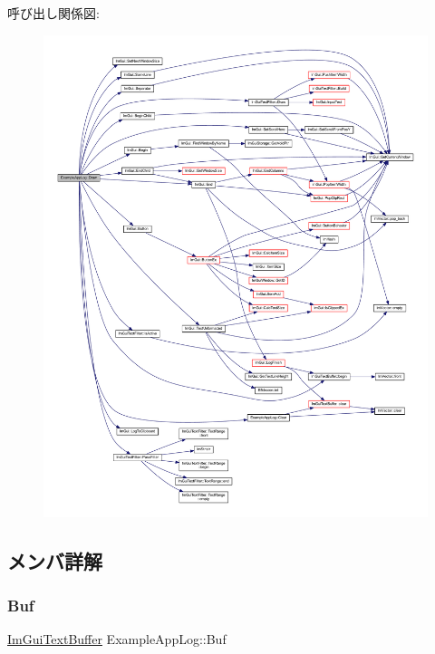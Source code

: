 呼び出し関係図\+:\nopagebreak
\begin{figure}[H]
\begin{center}
\leavevmode
\includegraphics[width=350pt]{struct_example_app_log_a5ad3a4bdb89171b84aeaff96948a1f77_cgraph}
\end{center}
\end{figure}


\subsection{メンバ詳解}
\mbox{\label{struct_example_app_log_a74fb7cd7bd8c2507b41331ebb7d0e56d}} 
\subsubsection{\texorpdfstring{Buf}{Buf}}
{\footnotesize\ttfamily \mbox{\hyperlink{struct_im_gui_text_buffer}{Im\+Gui\+Text\+Buffer}} Example\+App\+Log\+::\+Buf}



